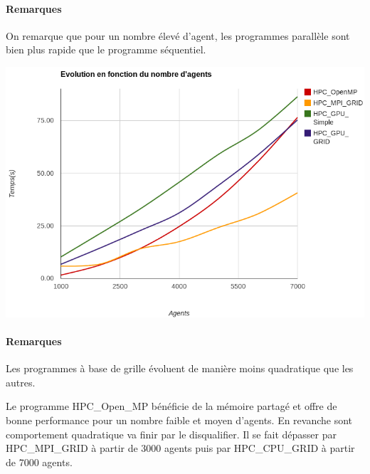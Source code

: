 \documentclass[liens,entete-ensimag,margeCorrection]{ensirapport}
\begin{document}
\paragraph{Remarques}

On remarque que pour un nombre élevé d'agent, les programmes parallèle sont bien plus rapide que le programme séquentiel.

\includegraphics[width=\linewidth]{ImageGlobalLight}

\paragraph{Remarques}

Les programmes à base de grille évoluent de manière moins quadratique que les autres.

Le programme HPC\_Open\_MP bénéficie de la mémoire partagé et offre de bonne performance pour un nombre faible et moyen d'agents.
En revanche sont comportement quadratique va finir par le disqualifier.
Il se fait dépasser par HPC\_MPI\_GRID à partir de 3000 agents puis par HPC\_CPU\_GRID à partir de 7000 agents.
\end{document}
